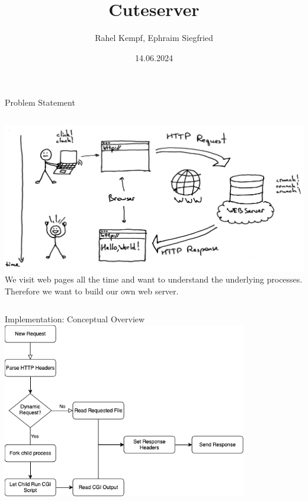\documentclass[aspectratio=169]{beamer}
\title              {Cuteserver}
\author             {Rahel Kempf, Ephraim Siegfried}
\institute          {Operating Systems, University of Basel}
\date               {14.06.2024}
\begin{document}
\begin{frame}[t,plain]
\titlepage
\end{frame}

\begin{frame}[c]{Problem Statement}
\begin{columns}[c]
        \includegraphics[width=\textwidth,height=\textheight,keepaspectratio]{webserver-comic.jpg}
   We visit web pages all the time and want to understand the underlying processes. Therefore we want to build our own web server.
\end{columns}
\end{frame}

\begin{frame}[c]{Implementation: Conceptual Overview}
    \centering
    \includegraphics[width=0.8\textwidth,height=0.8\textheight,keepaspectratio]{web_server_inner_workings.png}
\end{frame}
\end{document}
